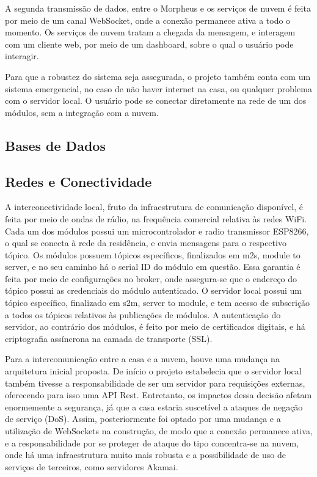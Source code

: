 A segunda transmissão de dados, entre o Morpheus e os serviços de nuvem é feita por meio de um canal WebSocket, onde a conexão permanece ativa a todo o momento. Os serviços de nuvem tratam a chegada da mensagem, e interagem com um cliente web, por meio de um dashboard, sobre o qual o usuário pode interagir.

Para que a robustez do sistema seja assegurada, o projeto também conta com um sistema emergencial, no caso de não haver internet na casa, ou qualquer problema com o servidor local. O usuário pode se conectar diretamente na rede de um dos módulos, sem a integração com a nuvem.


\subsection{Bases de Dados}

\subsection{Redes e Conectividade}

A interconectividade local, fruto da infraestrutura de comunicação disponível, é feita por meio de ondas de rádio, na frequência comercial relativa às redes WiFi. Cada um dos módulos possui um microcontrolador e radio transmissor ESP8266, o qual se conecta à rede da residência, e envia mensagens para o respectivo tópico. Os módulos possuem tópicos específicos, finalizados em m2s, module to  server, e no seu caminho há o serial ID do módulo em questão. Essa garantia é feita por meio de configurações no broker, onde assegura-se que o endereço do tópico possui as credenciais do módulo autenticado.
O servidor local possui um tópico específico, finalizado em s2m, server to module, e tem acesso de subscrição a todos os tópicos relativos às publicações de módulos. A autenticação do servidor, ao contrário dos módulos, é feito por meio de certificados digitais, e há criptografia assíncrona na camada de transporte (SSL).

Para a intercomunicação entre a casa e a nuvem, houve uma mudança na arquitetura inicial proposta. De início o projeto estabelecia que o servidor local também tivesse a responsabilidade de ser um servidor para requisições externas, oferecendo para isso uma API Rest. Entretanto, os impactos dessa decisão afetam enormemente a segurança, já que a casa estaria suscetível a ataques de negação de serviço (DoS). Assim, posteriormente foi optado por uma mudança e a utilização de WebSockets na construção, de modo que a conexão permanece ativa, e a responsabilidade por se proteger de ataque do tipo concentra-se na nuvem, onde há uma infraestrutura muito mais robusta e a possibilidade de uso de serviços de terceiros, como servidores Akamai.

